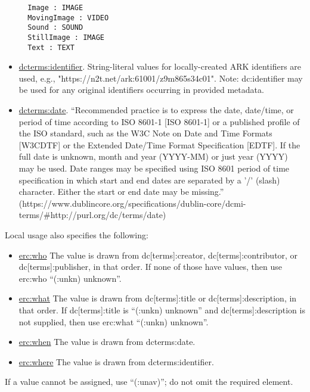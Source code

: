 \documentclass[11pt]{article}
\begin{document}
\begin{itemize}
\begin{verbatim}
  Image : IMAGE
  MovingImage : VIDEO
  Sound : SOUND
  StillImage : IMAGE
  Text : TEXT
\end{verbatim}

  \item \underline{dcterms:identifier}. String-literal values for locally-created ARK identifiers are used, e.g., "https://n2t.net/ark:61001/z9m865s34c01". Note: dc:identifier may be used for any original identifiers occurring in provided metadata.

  \item \underline{dcterms:date}. ``Recommended practice is to express the date, date/time, or period of time according to ISO 8601-1 [ISO 8601-1] or a published profile of the ISO standard, such as the W3C Note on Date and Time Formats [W3CDTF] or the Extended Date/Time Format Specification [EDTF]. If the full date is unknown, month and year (YYYY-MM) or just year (YYYY) may be used. Date ranges may be specified using ISO 8601 period of time specification in which start and end dates are separated by a '/' (slash) character. Either the start or end date may be missing.'' (https://www.dublincore.org/specifications/dublin-core/dcmi-terms/\#http://purl.org/dc/terms/date)

\end{itemize}

Local usage also specifies the following:

\begin{itemize}
\item \underline{erc:who} The value is drawn from dc[terms]:creator, dc[terms]:contributor, or dc[terms]:publisher, in that order. If none of those have values, then use erc:who ``(:unkn) unknown''.
\item \underline{erc:what} The value is drawn from dc[terms]:title or dc[terms]:description, in that order. If dc[terms]:title is ``(:unkn) unknown'' and dc[terms]:description is not supplied, then use erc:what ``(:unkn) unknown''.
\item \underline{erc:when} The value is drawn from dcterms:date.
\item \underline{erc:where} The value is drawn from dcterms:identifier.
\end{itemize}


If a value cannot be assigned, use ``(:unav)''; do not omit the required element.
\end{document}

